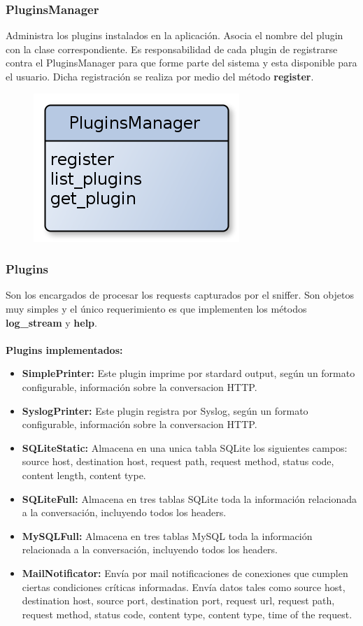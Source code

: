 \subsubsection{PluginsManager}

Administra los plugins instalados en la aplicación. Asocia el nombre del plugin con la clase correspondiente. Es responsabilidad de cada plugin de registrarse contra el PluginsManager para que forme parte del sistema y esta disponible para el usuario. Dicha registración se realiza por medio del método \textbf{register}.

\begin{figure}[hbtp]
    \centering
	\includegraphics[scale=0.40]{img/PluginsManager.png} 
\end{figure}

\subsubsection{Plugins}

Son los encargados de procesar los requests capturados por el sniffer. Son objetos muy simples y el único requerimiento es que implementen los métodos \textbf{log\_stream} y \textbf{help}. 
\\\\
\textbf{Plugins implementados:}
\begin{itemize}
	\item \textbf{SimplePrinter:} Este plugin imprime por stardard output, según un formato configurable, información sobre la conversacion HTTP.
	\item \textbf{SyslogPrinter: } Este plugin registra por Syslog, según un formato configurable, información sobre la conversacion HTTP.
	\item \textbf{SQLiteStatic:} Almacena en una unica tabla SQLite los siguientes campos: source host, destination host, request path, request method, status code, content length, content type.
	\item \textbf{SQLiteFull: } Almacena en tres tablas SQLite toda la información relacionada a la conversación, incluyendo todos los headers.
	\item \textbf{MySQLFull: } Almacena en tres tablas MySQL toda la información relacionada a la conversación, incluyendo todos los headers.
	\item \textbf{MailNotificator: } Envía por mail notificaciones de conexiones que cumplen ciertas condiciones críticas informadas. Envía datos tales como source host, destination host, source port, destination port, request url, request path, request method, status code, content type, content type, time of the request.
\end{itemize}

